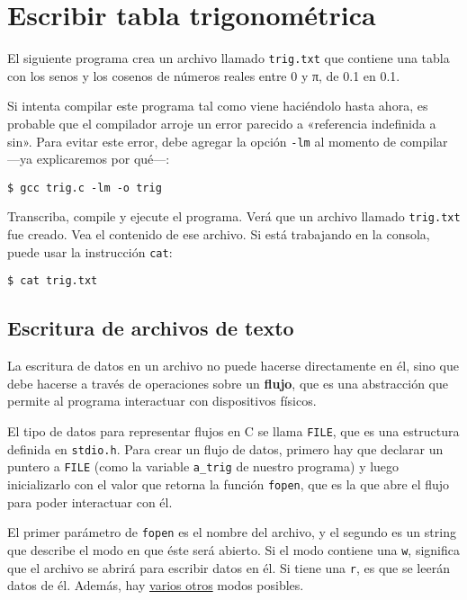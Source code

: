 \section{Escribir tabla trigonométrica}

El siguiente programa crea un archivo llamado \lstinline!trig.txt! que
contiene una tabla con los senos y los cosenos de números reales entre 0
y π, de 0.1 en 0.1.

Si intenta compilar este programa tal como viene haciéndolo hasta ahora,
es probable que el compilador arroje un error parecido a «referencia
indefinida a sin». Para evitar este error, debe agregar la opción
\lstinline!-lm! al momento de compilar ---ya explicaremos por qué---:

\begin{lstlisting}
$ gcc trig.c -lm -o trig
\end{lstlisting}

Transcriba, compile y ejecute el programa. Verá que un archivo llamado
\lstinline!trig.txt! fue creado. Vea el contenido de ese archivo. Si
está trabajando en la consola, puede usar la instrucción
\lstinline!cat!:

\begin{lstlisting}
$ cat trig.txt
\end{lstlisting}

\subsection{Escritura de archivos de texto}

La escritura de datos en un archivo no puede hacerse directamente en él,
sino que debe hacerse a través de operaciones sobre un \textbf{flujo},
que es una abstracción que permite al programa interactuar con
dispositivos físicos.

El tipo de datos para representar flujos en C se llama \lstinline!FILE!,
que es una estructura definida en \lstinline!stdio.h!. Para crear un
flujo de datos, primero hay que declarar un puntero a \lstinline!FILE!
(como la variable \lstinline!a_trig! de nuestro programa) y luego
inicializarlo con el valor que retorna la función \lstinline!fopen!, que
es la que abre el flujo para poder interactuar con él.

El primer parámetro de \lstinline!fopen! es el nombre del archivo, y el
segundo es un string que describe el modo en que éste será abierto. Si
el modo contiene una \lstinline!w!, significa que el archivo se abrirá
para escribir datos en él. Si tiene una \lstinline!r!, es que se leerán
datos de él. Además, hay
\href{http://c.conclase.net/librerias/?ansifun=fopen}{varios otros}
modos posibles.

